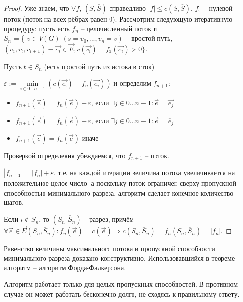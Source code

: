 	\begin{proof}
		Уже знаем, что $\forall f$, $(S, \overline{S})$ справедливо $|f| \leqslant c(S, \overline{S})$.
		$f_0$ -- нулевой поток (поток на всех рёбрах равен 0).
		Рассмотрим следующую итеративную процедуру: пусть есть
		$f_n$ -- целочисленный поток и \\
		$S_n$ = \{ $v \in V(G) | (s = v_0, ..., v_n = v)$ -- простой путь,
		$(e_i, v_i, v_{i+1}) = \overrightarrow{e_i} \in \overrightarrow{E}, c(\overrightarrow{e_i}) - f_n(\overrightarrow{e_i}) > 0 \}$.

		Пусть $t \in S_n$ (есть простой путь из истока в сток).
		
		$\varepsilon := \underset{i \in 0... n-1}{\min}(c(\overrightarrow{e_i}) - f_n(\overrightarrow{e_i}))$ и определим $f_{n+1}$:

		\begin{itemize}
			\item $f_{n+1}(\overrightarrow{e}) = f_n(\overrightarrow{e}) + \varepsilon$, если $\exists j \in 0 ... n - 1: \overrightarrow{e} = \overrightarrow{e_j}$ 
			\item $f_{n+1}(\overrightarrow{e}) = f_n(\overrightarrow{e}) - \varepsilon$, если $\exists j \in 0 ... n - 1: \overrightarrow{e} = \overleftarrow{e_j}$
			\item $f_{n+1}(\overrightarrow{e}) = f_n(\overrightarrow{e})$ иначе
		\end{itemize}
		Проверкой определения убеждаемся, что $f_{n+1}$ -- поток.

		$|f_{n+1}| = |f_n| + \varepsilon$, т.е. на каждой итерации величина потока увеличивается на положительное целое число, а поскольку поток ограничен сверху пропускной способностью минимального разреза, алгоритм сделает конечное количество шагов.

		Если $t \notin S_n$, то $(S_n, \overline{S}_n)$ -- разрез, причём \\
		$\forall \overrightarrow{e} \in \overrightarrow{E}(S_n, \overline{S}_n) : f_n (\overrightarrow{e}) = c(\overrightarrow{e}) \Rightarrow c(S_n, \overline{S}_n) = f_n(S_n, \overline{S}_n) = |f_n|.$
	\end{proof}

	\begin{Rem}
		Равенство величины максимального потока и пропускной способности минимального разреза доказано конструктивно.
		Использовавшийся в теореме алгоритм -- алгоритм Форда-Фалкерсона.
	\end{Rem}

	\begin{Rem}
		Алгоритм работает только для целых пропускных способностей. В противном случае он может работать бесконечно долго, не сходясь к правильному ответу.
	\end{Rem}


